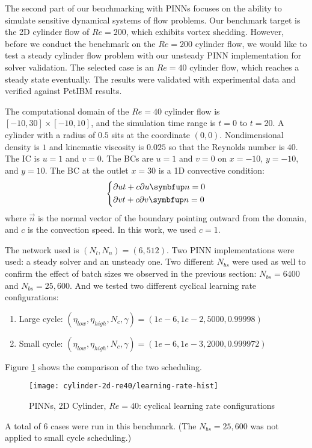 The second part of our benchmarking with PINNs focuses on the ability to simulate sensitive dynamical systems of flow problems.
Our benchmark target is the 2D cylinder flow of $Re=200$, which exhibits vortex shedding.
However, before we conduct the benchmark on the $Re=200$ cylinder flow, we would like to test a steady cylinder flow problem with our unsteady PINN implementation for solver validation.
The selected case is an $Re=40$ cylinder flow, which reaches a steady state eventually.
The results were validated with experimental data and verified against PetIBM results.

The computational domain of the $Re=40$ cylinder flow is $[-10, 30]\times[-10, 10]$, and the simulation time range is $t=0$ to $t=20$.
A cylinder with a radius of $0.5$ sits at the coordinate $(0, 0)$.
Nondimensional density is $1$ and kinematic viscosity is $0.025$ so that the Reynolds number is $40$.
The IC is $u=1$ and $v=0$.
The BCs are $u=1$ and $v=0$ on $x=-10$, $y=-10$, and $y=10$.
The BC at the outlet $x=30$ is a 1D convective condition:
\begin{equation}\label{eq:convec-bc}
    \left\{
    \begin{aligned}
        &\pdiff{u}{t} + c\pdiff{u}{\vec{n}} = 0 \\
        &\pdiff{v}{t} + c\pdiff{v}{\vec{n}} = 0 \\
    \end{aligned}
    \right.
\end{equation}
where $\vec{n}$ is the normal vector of the boundary pointing outward from the domain, and $c$ is the convection speed.
In this work, we used $c=1$.

The network used is $(N_l, N_n)=(6, 512)$.
Two PINN implementations were used: a steady solver and an unsteady one.
Two different $N_{bs}$ were used as well to confirm the effect of batch sizes we observed in the previous section: $N_{bs}=6400$ and $N_{bs}=25,600$.
And we tested two different cyclical learning rate configurations:
\begin{enumerate}[nolistsep]
    \item Large cycle: $(\eta_{low}, \eta_{high}, N_c, \gamma)=(1e-6, 1e-2, 5000, 0.99998)$
    \item Small cycle: $(\eta_{low}, \eta_{high}, N_c, \gamma)=(1e-6, 1e-3, 2000, 0.999972)$
\end{enumerate}
Figure \ref{fig:cylinder-2d-re40-lr-hist} shows the comparison of the two scheduling.
\begin{figure}[hbt!]
    \texttt{[image: cylinder-2d-re40/learning-rate-hist]}
    \caption[
        PINNs, 2D Cylinder, $Re=40$: cyclical learning rate configurations%
    ]{%
        PINNs, 2D Cylinder, $Re=40$: cyclical learning rate configurations%
    }%
    \label{fig:cylinder-2d-re40-lr-hist}
\end{figure}
A total of 6 cases were run in this benchmark.
(The $N_{bs}=25,600$ was not applied to small cycle scheduling.)

